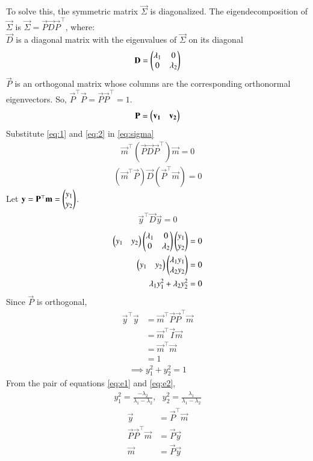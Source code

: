 \documentclass[journal]{IEEEtran}
\begin{document}
To solve this, the symmetric matrix $\vec{\Sigma}$ is diagonalized. The eigendecomposition of $\vec{\Sigma}$ is $\vec{\Sigma} = \vec{P}\vec{D}\vec{P}^\top$, where: \\
$\vec{D}$ is a diagonal matrix with the eigenvalues of $\vec{\Sigma}$ on its diagonal
\begin{align}
    \mathbf{D} = \begin{pmatrix}\lambda_1 & 0 \\ 0 & \lambda_2\end{pmatrix} \label{eq:1}
\end{align}
$\vec{P}$ is an orthogonal matrix whose columns are the corresponding orthonormal eigenvectors. So, $\vec{P}^\top \vec{P} = \vec{P}\vec{P}^\top = 1$.
\begin{align}
    \mathbf{P} = \begin{pmatrix}\mathbf{v_1} & \mathbf{v_2}\end{pmatrix} \label{eq:2}
\end{align}
Substitute \eqref{eq:1} and \eqref{eq:2} in \eqref{eq:sigma}
\begin{align}
    \vec{m}^\top (\vec{P}\vec{D}\vec{P}^\top) \vec{m} = 0
\end{align}
\begin{align}
    (\vec{m}^\top \vec{P})\vec{D}(\vec{P}^\top \vec{m}) = 0
\end{align}
Let $\mathbf{y} = \mathbf{P}^\top \mathbf{m} = \begin{pmatrix}y_1 \\ y_2\end{pmatrix} $.
\begin{align}
    \vec{y}^\top \vec{D} \vec{y} = 0
\end{align}
\begin{align}
    \begin{pmatrix}y_1 & y_2\end{pmatrix} \begin{pmatrix}\lambda_1 & 0 \\ 0 & \lambda_2\end{pmatrix} \begin{pmatrix}y_1 \\ y_2\end{pmatrix} &= 0 \\
    \begin{pmatrix}y_1 & y_2\end{pmatrix} \begin{pmatrix}\lambda_1 y_1 \\ \lambda_2 y_2\end{pmatrix} &= 0 \\
    \lambda_1 y_1^2 + \lambda_2 y_2^2 &= 0 \label{eq:e1}
\end{align}
Since $\vec{P}$ is orthogonal,
\begin{align}
    \vec{y}^\top\vec{y} &= \vec{m}^\top\vec{P}\vec{P}^\top\vec{m} \\
    &= \vec{m}^\top\vec{I}\vec{m} \\
    &= \vec{m}^\top\vec{m} \\
    &= 1
\end{align}
\begin{align}
    \implies y_1^2 + y_2^2 = 1 \label{eq:e2}
\end{align}
From the pair of equations \eqref{eq:e1} and \eqref{eq:e2},
\begin{align}
    y_1^2 = \frac{-\lambda_2}{\lambda_1-\lambda_2},\text{ }y_2^2 = \frac{\lambda_1}{\lambda_1-\lambda_2}
\end{align}
\begin{align}
    \vec{y} &= \vec{P}^\top \vec{m} \\
    \vec{P}\vec{P}^\top\vec{m} &= \vec{P}\vec{y} \\
    \vec{m} &= \vec{P}\vec{y} \label{eq:equation}
\end{align}
\end{document}
